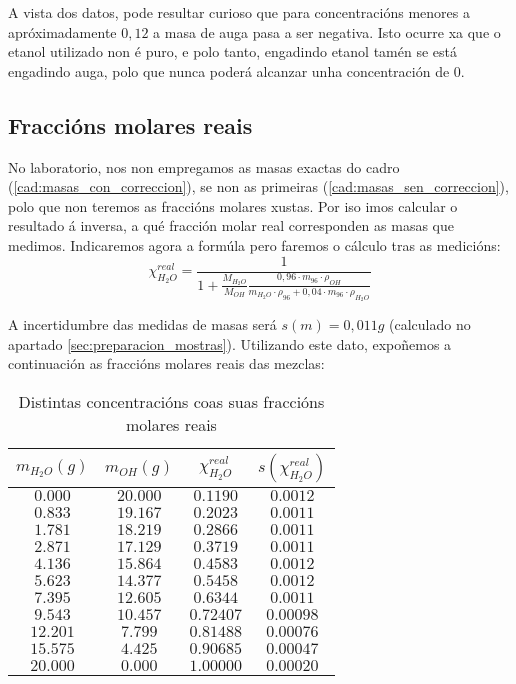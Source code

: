 \documentclass[12pt, a4paper, titlepage]{article}
\begin{document}
  A vista dos datos, pode resultar curioso que para concentracións menores a apróximadamente $0,12$ a masa de auga pasa a ser negativa. Isto ocurre xa que o etanol utilizado non é puro, e polo tanto, engadindo etanol tamén se está engadindo auga, polo que nunca poderá alcanzar unha concentración de $0$.

  \subsection{Fraccións molares reais}

  No laboratorio, nos non empregamos as masas exactas do cadro (\ref{cad:masas_con_correccion}), se non as primeiras (\ref{cad:masas_sen_correccion}), polo que non teremos as fraccións molares xustas. Por iso imos calcular o resultado á inversa, a qué fracción molar real corresponden as masas que medimos. Indicaremos agora a formúla pero faremos o cálculo tras as medicións:
  \begin{equation}
    \chi_{H_2O}^{real} = \frac{1}{1 + \frac{M_{H_2O}}{M_{OH}} \frac{0,96 \cdot m_{96} \cdot \rho_{OH}}{m_{H_2O} \cdot \rho_{96} + 0,04 \cdot m_{96} \cdot \rho_{H_2O}}}
    \label{ec:fraccions_molares_reais}
  \end{equation}

  A incertidumbre das medidas de masas será $s(m) = 0,011g$ (calculado no apartado \ref{sec:preparacion_mostras}). Utilizando este dato, expoñemos a continuación as fraccións molares reais das mezclas:

  \begin{table}[H]
    \centering
    \begin{tabular}{|c|c|c|c|}
    \hline
    $m_{H_2O} (g)$ & $m_{OH} (g)$ & $\chi_{H_2O}^{real}$ & $s(\chi_{H_2O}^{real})$ \\ \hline
    $ 0.000 $  &  $ 20.000 $  &  $ 0.1190 $  &  $ 0.0012 $ \\ \hline
    $ 0.833 $  &  $ 19.167 $  &  $ 0.2023 $  &  $ 0.0011 $ \\ \hline
    $ 1.781 $  &  $ 18.219 $  &  $ 0.2866 $  &  $ 0.0011 $ \\ \hline
    $ 2.871 $  &  $ 17.129 $  &  $ 0.3719 $  &  $ 0.0011 $ \\ \hline
    $ 4.136 $  &  $ 15.864 $  &  $ 0.4583 $  &  $ 0.0012 $ \\ \hline
    $ 5.623 $  &  $ 14.377 $  &  $ 0.5458 $  &  $ 0.0012 $ \\ \hline
    $ 7.395 $  &  $ 12.605 $  &  $ 0.6344 $  &  $ 0.0011 $ \\ \hline
    $ 9.543 $  &  $ 10.457 $  &  $ 0.72407 $  &  $ 0.00098 $ \\ \hline
    $ 12.201 $  &  $ 7.799 $  &  $ 0.81488 $  &  $ 0.00076 $ \\ \hline
    $ 15.575 $  &  $ 4.425 $  &  $ 0.90685 $  &  $ 0.00047 $ \\ \hline
    $ 20.000 $  &  $ 0.000 $  &  $ 1.00000 $  &  $ 0.00020 $ \\ \hline
    \end{tabular}
    \caption{Distintas concentracións coas suas fraccións molares reais}
    \label{cad:fraccions_molares_reais}
  \end{table}
\end{document}
